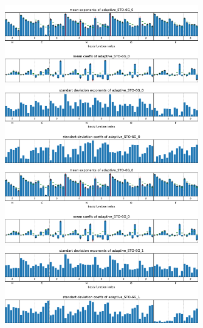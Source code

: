 \begin{figure}
    \centering
    \includegraphics[width=0.75\textwidth]{chapters/results/results_images/adaptive_basis_functions/mean_exps_and_coeffsadaptive_STO-6G_0}
    \includegraphics[width=0.75\textwidth]{chapters/results/results_images/adaptive_basis_functions/std_exps_and_coeffsadaptive_STO-6G_0}
    \includegraphics[width=0.75\textwidth]{chapters/results/results_images/adaptive_basis_functions/mean_exps_and_coeffsadaptive_STO-6G_0}
    \includegraphics[width=0.75\textwidth]{chapters/results/results_images/adaptive_basis_functions/std_exps_and_coeffsadaptive_STO-6G_1}
\end{figure}


